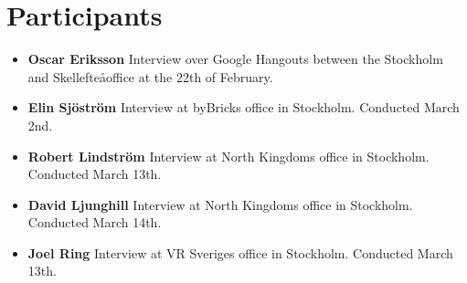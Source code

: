 \chapter{Participants}
\begin{itemize}
  \item\textbf{Oscar Eriksson} Interview over Google Hangouts between the Stockholm and Skellefte\aa office at the 22th of February.
  \item  \textbf{Elin Sj\"ostr\"om} Interview at byBricks office in Stockholm. Conducted March 2nd.
  \item\textbf{Robert Lindstr\"om} Interview at North Kingdoms office in Stockholm. Conducted March 13th.
  \item\textbf{David Ljunghill} Interview at North Kingdoms office in Stockholm. Conducted March 14th.
  \item\textbf{Joel Ring} Interview at VR Sveriges office in Stockholm. Conducted March 13th.
\end{itemize}
